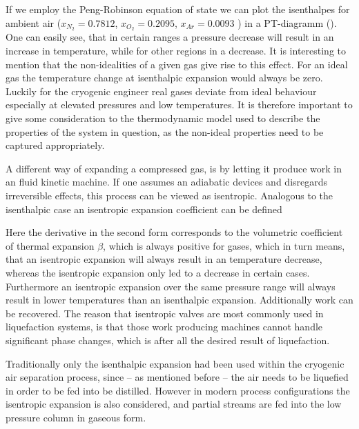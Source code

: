         If we employ the Peng-Robinson equation of state we can plot the isenthalpes for ambient air
        ($x_{N_2}=0.7812$, $x_{O_2}=0.2095$, $x_{Ar}=0.0093$ ) in a PT-diagramm ().
        One can easily see, that in certain ranges a pressure decrease will result in an increase in temperature,
        while for other regions in a decrease. It is interesting to mention that the non-idealities
        of a given gas give rise to this effect. For an ideal gas the temperature change at isenthalpic
        expansion would always be zero. Luckily for the cryogenic engineer real gases deviate from ideal
        behaviour especially at elevated pressures and low temperatures. It is therefore important to give some
        consideration to the thermodynamic model used to describe the properties of the system in question, as the
        non-ideal properties need to be captured appropriately.

        A different way of expanding a compressed gas, is by letting it produce work in an fluid kinetic machine.
        If one assumes an adiabatic devices and disregards irreversible effects, this process can be viewed as
        isentropic. Analogous to the isenthalpic case an isentropic expansion coefficient can be defined

        Here the derivative in the second form corresponds to the volumetric coefficient of thermal expansion
        $\beta$, which is always positive for gases, which in turn means, that an isentropic expansion
        will always result in an temperature decrease, whereas the isentropic expansion only led to a decrease in
        certain cases. Furthermore an isentropic expansion over the same pressure range will always result in
        lower temperatures than an isenthalpic expansion. Additionally work can be recovered. The reason
        that isentropic valves are most commonly used in liquefaction systems, is that those work producing
        machines cannot handle significant phase changes, which is after all the desired result of liquefaction.

        Traditionally only the isenthalpic expansion had been used within the cryogenic air separation process,
        since -- as mentioned before -- the air needs to be liquefied in order to be fed into be distilled. However
        in modern process configurations the isentropic expansion is also considered, and partial streams are fed into
        the low pressure column in gaseous form.